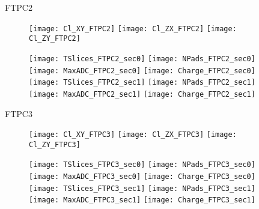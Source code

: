 \documentclass[11pt]{beamer}
\begin{document}
\begin{frame}
\centering
\Huge
FTPC2
\end{frame}

\begin{frame}{}
\begin{figure}
\centering
\texttt{[image: Cl\_XY\_FTPC2]}
\texttt{[image: Cl\_ZX\_FTPC2]}
\texttt{[image: Cl\_ZY\_FTPC2]}
\end{figure}
\end{frame}

\begin{frame}{}
\begin{figure}
\centering
\texttt{[image: TSlices\_FTPC2\_sec0]}
\texttt{[image: NPads\_FTPC2\_sec0]}
\texttt{[image: MaxADC\_FTPC2\_sec0]}
\texttt{[image: Charge\_FTPC2\_sec0]} \\
\texttt{[image: TSlices\_FTPC2\_sec1]}
\texttt{[image: NPads\_FTPC2\_sec1]}
\texttt{[image: MaxADC\_FTPC2\_sec1]}
\texttt{[image: Charge\_FTPC2\_sec1]}
\end{figure}
\end{frame}

\begin{frame}
\centering
\Huge
FTPC3
\end{frame}

\begin{frame}{}
\begin{figure}
\centering
\texttt{[image: Cl\_XY\_FTPC3]}
\texttt{[image: Cl\_ZX\_FTPC3]}
\texttt{[image: Cl\_ZY\_FTPC3]}
\end{figure}
\end{frame}

\begin{frame}{}
\begin{figure}
\centering
\texttt{[image: TSlices\_FTPC3\_sec0]}
\texttt{[image: NPads\_FTPC3\_sec0]}
\texttt{[image: MaxADC\_FTPC3\_sec0]}
\texttt{[image: Charge\_FTPC3\_sec0]} \\
\texttt{[image: TSlices\_FTPC3\_sec1]}
\texttt{[image: NPads\_FTPC3\_sec1]}
\texttt{[image: MaxADC\_FTPC3\_sec1]}
\texttt{[image: Charge\_FTPC3\_sec1]}
\end{figure}
\end{frame}
\end{document}
